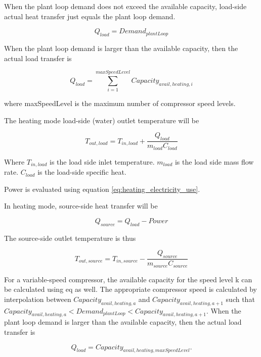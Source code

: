When the plant loop demand does not exceed the available capacity, load-side
actual heat transfer just equals the plant loop demand.

\begin{equation}
Q_{load} = Demand_{plantLoop}
\end{equation}

When the plant loop demand is larger than the available capacity, then the
actual load transfer is

\begin{equation}
Q_{load} = \sum_{i=1}^{maxSpeedLevel} Capacity_{avail,heating,i}
\end{equation}

where maxSpeedLevel is the maximum number of compressor speed levels.

The heating mode load-side (water) outlet temperature will be

\begin{equation}
T_{out,load} = T_{in,load} + \frac{Q_{load}}{m_{load}C_{load}}
\end{equation}

Where $T_{in,load}$ is the load side inlet temperature. $m_{load}$ is the load
side mass flow rate. $C_{load}$ is the load-side specific heat.

Power is evaluated using equation \ref{eq:heating_electricity_use}.

In heating mode, source-side heat transfer will be

\begin{equation}
Q_{source} = Q_{load} - Power
\end{equation}

The source-side outlet temperature is thus

\begin{equation}
T_{out,source} = T_{in,source} - \frac{Q_{source}}{m_{source}C_{source}}
\end{equation}

For a variable-speed compressor, the available capacity for the speed level k
can be calculated using eq as well. The appropriate compressor speed is
calculated by interpolation between $Capacity_{avail,heating,a}$ and
$Capacity_{avail,heating,a+1}$ such that $Capacity_{avail,heating,a} <
Demand_{plantLoop} < Capacity_{avail,heating,a+1}$. When the plant loop demand
is larger than the available capacity, then the actual load transfer is

\begin{equation}
Q_{load} = Capacity_{avail,heating,maxSpeedLevel} .
\end{equation}

